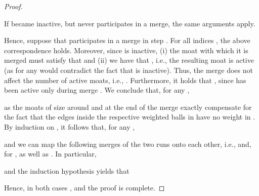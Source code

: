 \documentclass[letterpaper,11pt]{article}
\begin{document}
\begin{proof}
\begin{compactitem}
  \item If  became inactive, but never participates in a merge, the
  same arguments apply.
\end{compactitem}
Hence, suppose that  participates in a merge in step
. For all indices , the above correspondence holds. Moreover,
since  is inactive, (i) the moat  with which it is
merged must satisfy that  and (ii) we have that
, i.e., the resulting moat is active (as
 for any  would
contradict the fact that  is inactive). Thus, the merge does not
affect the number of active moats, i.e., .
Furthermore, it holds that , since
 has been active only during merge . We conclude that, for any
,

as the moats of size  around  and  at the end of the 
merge exactly compensate for the fact that the edges inside the respective
weighted balls in  have no weight in . By induction on , it follows that, for any ,

and we can map the following merges of the two runs onto each other, i.e.,
 and, for ,  as well as
. In particular,

and the induction hypothesis yields that

Hence, in both cases , and the proof is complete.
\end{proof}
\end{document}
